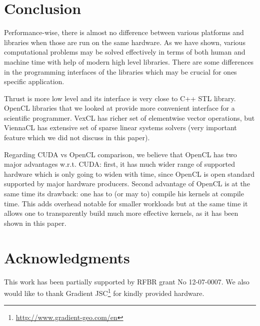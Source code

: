 \documentclass[1p]{elsarticle}
\begin{document}
\section{Conclusion}

Performance-wise, there is almost no difference between various platforms and
libraries when those are run on the same hardware. As we have shown, various
computational problems may be solved effectively in terms of both human and
machine time with help of modern high level libraries.  There are some
differences in the programming interfaces of the libraries which may be crucial
for ones specific application. 

Thrust is more low level and its interface is very close to C++ STL library.
OpenCL libraries that we looked at provide more convenient interface for a
scientific programmer. VexCL has richer set of elementwise vector operations,
but ViennaCL has extensive set of sparse linear systems solvers (very important
feature which we did not discuss in this paper).

Regarding CUDA vs OpenCL comparison, we believe that OpenCL has two major
advantages w.r.t. CUDA: first, it has much wider range of supported hardware
which is only going to widen with time, since OpenCL is open standard supported
by major hardware producers. Second advantage of OpenCL is at the same time its
drawback: one has to (or may to) compile his kernels at compile time. This adds
overhead notable for smaller workloads but at the same time it allows one to
transparently build much more effective kernels, as it has been shown in this
paper. 

\section{Acknowledgments}

This work has been partially supported by RFBR grant No 12-07-0007. We also
would like to thank Gradient
JSC\footnote{\href{http://www.gradient-geo.com/en}{http://www.gradient-geo.com/en}}
for kindly provided hardware.

\nocite{*}


\end{document}
